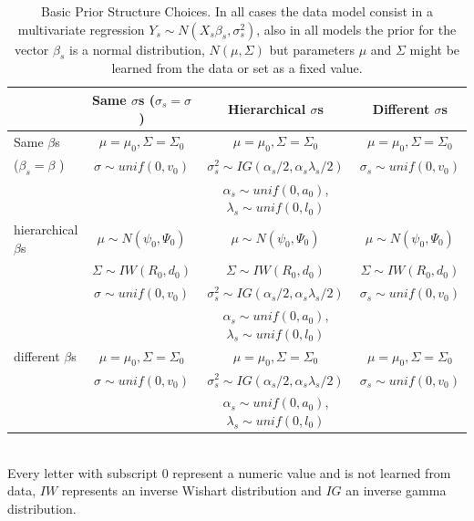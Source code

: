 \documentclass{article}
\begin{document}
\begin{table}[h]
\caption{Basic Prior Structure Choices. In all cases the data model consist in a multivariate regression $Y_s \sim N(X_s\beta_s,\sigma_s^2)$, also in all models the prior for the vector $\beta_s$ is a normal distribution, $N(\mu, \Sigma)$ but  parameters $\mu$ and $\Sigma$ might be learned from the data or set as a fixed value. \label{stmod} } 
\begin{tabular}{|l|ccc|} \hline \hline
& Same $\sigma$s ($\sigma_s=\sigma$) & Hierarchical $\sigma$s & Different $\sigma$s \\ \hline\hline
Same   
$\beta$s &$\mu=\mu_0, \Sigma=\Sigma_0$ &$\mu=\mu_0, \Sigma=\Sigma_0$&$\mu=\mu_0, \Sigma=\Sigma_0$ \\
($\beta_s = \beta$ ) &$\sigma\sim unif(0, v_0)$ &$\sigma^2_s\sim IG(\alpha_s/2, \alpha_s\lambda_s/2)$& $\sigma_s\sim unif(0, v_0)$ \\ 
& & $\alpha_s \sim unif(0,a_0)$, $\lambda_s\sim unif(0,l_0)$ & \\ \hline 
hierarchical $\beta$s
& $\mu \sim N(\psi_0, \Psi_0) $ & $\mu \sim N(\psi_0, \Psi_0) $ & $\mu \sim N(\psi_0, \Psi_0) $ \\ 
& $\Sigma \sim IW(R_0,d_0)$& $\Sigma \sim IW(R_0,d_0)$& $\Sigma \sim IW(R_0,d_0)$ \\  
&$\sigma\sim unif(0, v_0)$ &$\sigma^2_s\sim IG(\alpha_s/2, \alpha_s\lambda_s/2)$& $\sigma_s\sim unif(0, v_0)$ \\ 
& & $\alpha_s \sim unif(0,a_0)$, $\lambda_s\sim unif(0,l_0)$ & \\ \hline 
different $\beta$s
&$\mu=\mu_0, \Sigma=\Sigma_0$ &$\mu=\mu_0, \Sigma=\Sigma_0$&$\mu=\mu_0, \Sigma=\Sigma_0$ \\
&$\sigma\sim unif(0, v_0)$ &$\sigma^2_s\sim IG(\alpha_s/2, \alpha_s\lambda_s/2)$& $\sigma_s\sim unif(0, v_0)$ \\ 
& & $\alpha_s \sim unif(0,a_0)$, $\lambda_s\sim unif(0,l_0)$ & \\ \hline\hline
\end{tabular} \\
\small{Every letter with subscript 0 represent a numeric value and is not learned from data, $IW$ represents an inverse Wishart distribution and $IG$ an inverse gamma distribution.}
\end{table}
\end{document}
